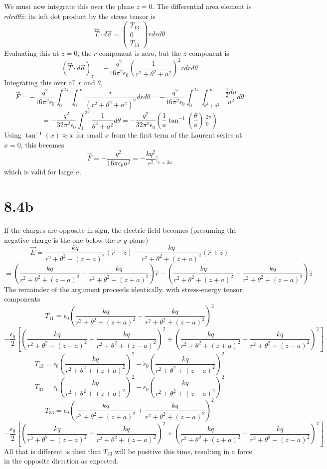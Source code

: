 \documentclass{article}
\begin{document}
We must now integrate this over the plane $z=0$. The differential area element is $rdrd\theta\hat{z}$; its left dot product by the stress tensor is
\[\overset{\leftrightarrow}{T}\cdot d\vec{a}=
  \begin{pmatrix}
    T_{13} \\
    0 \\
    T_{33}
  \end{pmatrix}rdrd\theta
\]
Evaluating this at $z=0$, the $r$ component is zero, but the $z$ component is
\[\left( \overset{\leftrightarrow}{T}\cdot d\vec{a}\right)_{z}=-\frac{q^{2}}{16\pi^{2}\epsilon_{0}}\left( \frac{1}{r^{2}+\theta^{2}+a^{2}} \right)^{2}rdrd\theta\]
Integrating this over all $r$ and $\theta$,
\[\vec{F}=-\frac{q^{2}}{16\pi^{2}\epsilon_{0}}\int_{0}^{2\pi}\int_{0}^{\infty}\frac{r}{(r^{2}+\theta^{2}+a^{2})^{2}}drd\theta=-\frac{q^{2}}{16\pi^{2}\epsilon_{0}}\int_{0}^{2\pi}\int_{\theta^{2}+a^{2}}^{\infty}\frac{\frac{1}{2}du}{u^{2}}d\theta\]
\[=-\frac{q^{2}}{32\pi^{2}\epsilon_{0}}\int_{0}^{2\pi}\frac{1}{\theta^{2}+a^{2}}d\theta=-\frac{q^{2}}{32\pi^{2}\epsilon_{0}}\left( \frac{1}{a}\tan^{-1}\left( \frac{\theta}{a} \right)\bigg|_{0}^{2\pi} \right)\]
Using $\tan^{-1}(x)\approx x$ for small $x$ from the first term of the Laurent series at $x=0$, this becomes
\[\vec{F}=-\frac{q^{2}}{16\pi\epsilon_{0} a^{2}}=-\frac{kq^{2}}{r^{2}}\bigg|_{r=2a}\]
which is valid for large $a$.
\section*{8.4b}
If the charges are opposite in sign, the electric field becomes (presuming the negative charge is the one below the $x$-$y$ plane)
\[\vec{E}=\frac{kq}{r^2+\theta^2+(z-a)^2}(\hat{r}-\hat{z})-\frac{kq}{r^2+\theta^2+(z+a)^2}(\hat{r}+\hat{z})\]
\[=\left( \frac{kq}{r^2+\theta^2+(z-a)^2}-\frac{kq}{r^2+\theta^2+(z+a)^2}\right)\hat{r}-\left( \frac{kq}{r^2+\theta^2+(z+a)^2}+\frac{kq}{r^2+\theta^2+(z-a)^2}\right)\hat{z}\]
The remainder of the argument proceeds identically, with stress-energy tensor components
\[T_{11}=   \epsilon_{0} \left( \frac{kq}{r^2+\theta^2+(z+a)^2}-\frac{kq}{r^2+\theta^2+(z-a)^2}\right)^2\]\[-\frac{  \epsilon_{0}}{2}\left[ \left(  \frac{kq}{r^{2}+\theta^{2}+(z+a)^{2}}+ \frac{kq}{r^2+\theta^2+(z-a)^2}\right)^{2}+\left( \frac{kq}{r^2+\theta^2+(z+a)^2}- \frac{kq}{r^2+\theta^2+(z-a)^2} \right)^{2}\right]\]
\[T_{13}=  \epsilon_{0}\left( \frac{kq}{r^2+\theta^2+(z+a)^2}\right)^2-  \epsilon_{0}\left( \frac{kq}{r^2+\theta^2+(z-a)^2}\right)^2\]
\[T_{31}=  \epsilon_{0}\left( \frac{kq}{r^2+\theta^2+(z+a)^2}\right)^2-  \epsilon_{0}\left( \frac{kq}{r^2+\theta^2+(z-a)^2}\right)^2\]
\[T_{33}=
  \epsilon_{0}\left( \frac{kq}{r^2+\theta^2+(z+a)^2}+\frac{kq}{r^2+\theta^2+(z-a)^2}\right)^2\]\[-\frac{  \epsilon_{0}}{2}\left[ \left(  \frac{kq}{r^{2}+\theta^{2}+(z+a)^{2}}+ \frac{kq}{r^2+\theta^2+(z-a)^2}\right)^{2}+\left( \frac{kq}{r^2+\theta^2+(z+a)^2}- \frac{kq}{r^2+\theta^2+(z-a)^2} \right)^{2}\right]\]
All that is different is then that $T_{33}$ will be positive this time, resulting in a force in the opposite direction as expected.
\end{document}
